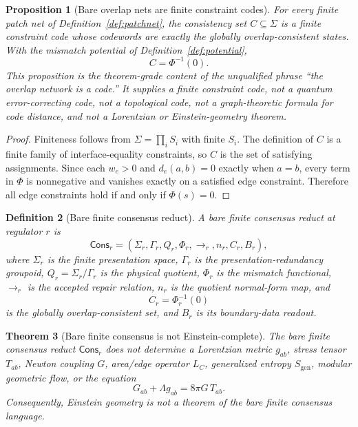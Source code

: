 \documentclass[11pt]{article}
\newtheorem{theorem}{Theorem}[section]
\newtheorem{definition}[theorem]{Definition}
\newtheorem{proposition}[theorem]{Proposition}
\theoremstyle{remark}
\theoremstyle{plain}
\begin{document}
\begin{proposition}[Bare overlap nets are finite constraint codes]\label{prop:constraint-code}
For every finite patch net of Definition~\ref{def:patchnet}, the consistency set \(C\subseteq
\Sigma\) is a finite constraint code whose codewords are exactly the globally overlap-consistent
states. With the mismatch potential of Definition~\ref{def:potential},
\[
C=\Phi^{-1}(0).
\]
This proposition is the theorem-grade content of the unqualified phrase ``the overlap network is
a code.'' It supplies a finite constraint code, not a quantum error-correcting code, not a
topological code, not a graph-theoretic formula for code distance, and not a Lorentzian or
Einstein-geometry theorem.
\end{proposition}

\begin{proof}
Finiteness follows from \(\Sigma=\prod_i S_i\) with finite \(S_i\). The definition of \(C\) is a
finite family of interface-equality constraints, so \(C\) is the set of satisfying assignments.
Since each \(w_e>0\) and \(d_e(a,b)=0\) exactly when \(a=b\), every term in \(\Phi\) is
nonnegative and vanishes exactly on a satisfied edge constraint. Therefore all edge constraints
hold if and only if \(\Phi(s)=0\).
\end{proof}

\begin{definition}[Bare finite consensus reduct]\label{def:bare-finite-consensus-reduct}
A bare finite consensus reduct at regulator \(r\) is
\[
\mathsf{Cons}_r
=
(\Sigma_r,\Gamma_r,Q_r,\Phi_r,\to_r,n_r,C_r,B_r),
\]
where \(\Sigma_r\) is the finite presentation space, \(\Gamma_r\) is the
presentation-redundancy groupoid, \(Q_r=\Sigma_r/\Gamma_r\) is the physical
quotient, \(\Phi_r\) is the mismatch functional, \(\to_r\) is the accepted
repair relation, \(n_r\) is the quotient normal-form map, and
\[
C_r=\Phi_r^{-1}(0)
\]
is the globally overlap-consistent set, and \(B_r\) is its boundary-data
readout.
\end{definition}

\begin{theorem}[Bare finite consensus is not Einstein-complete]
\label{thm:bare-consensus-not-einstein-complete}
The bare finite consensus reduct \(\mathsf{Cons}_r\) does not determine a
Lorentzian metric \(g_{ab}\), stress tensor \(T_{ab}\), Newton coupling \(G\),
area/edge operator \(L_C\), generalized entropy \(S_{\mathrm{gen}}\), modular
geometric flow, or the equation
\[
G_{ab}+\Lambda g_{ab}=8\pi G\,T_{ab}.
\]
Consequently, Einstein geometry is not a theorem of the bare finite consensus
language.
\end{theorem}
\end{document}
